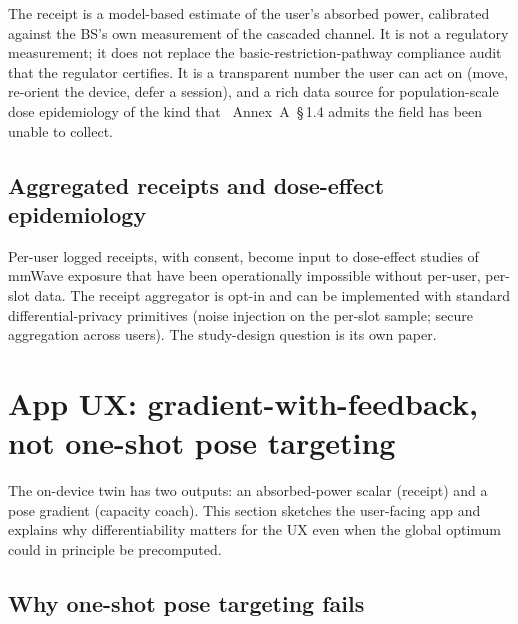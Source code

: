 \documentclass[11pt,a4paper]{article}
\theoremstyle{definition}
\begin{document}
The receipt is a model-based estimate of the user's absorbed
power, calibrated against the BS's own measurement of the
cascaded channel.  It is not a regulatory measurement; it does not
replace the basic-restriction-pathway compliance audit that the
regulator certifies.  It is a transparent number the user can act
on (move, re-orient the device, defer a session), and a rich data
source for population-scale dose epidemiology of the kind that
\cite{ICNIRP2020}~Annex~A~\S\,1.4 admits the field has been
unable to collect.

\subsection{Aggregated receipts and dose-effect epidemiology}

Per-user logged receipts, with consent, become input to dose-effect
studies of mmWave exposure that have been operationally impossible
without per-user, per-slot data.  The receipt aggregator is opt-in
and can be implemented with standard differential-privacy primitives
(noise injection on the per-slot sample; secure aggregation across
users).  The study-design question is its own paper.

\section{App UX: gradient-with-feedback, not one-shot pose targeting}\label{sec:app}

The on-device twin has two outputs: an absorbed-power scalar
(receipt) and a pose gradient (capacity coach).  This section
sketches the user-facing app and explains why differentiability
matters for the UX even when the global optimum could in principle
be precomputed.

\subsection{Why one-shot pose targeting fails}
\end{document}
